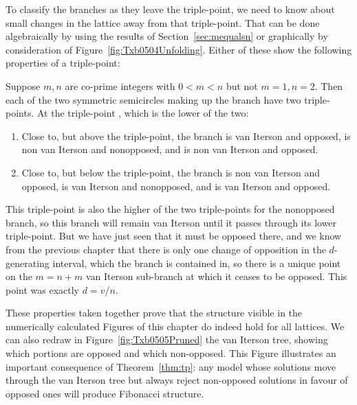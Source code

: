 %
%
To classify the branches as they leave the triple-point, we need to know about small changes in the lattice away from that triple-point. That can be done algebraically by using the results of Section~\ref{sec:mequalsn} or graphically by consideration of Figure~\ref{fig:Txb0504Unfolding}. Either of these show the following properties of a triple-point:
\begin{theorem}
	Suppose $m,n$ are co-prime integers with $0<m<n$ but not $m=1,n=2$. Then each of the two symmetric semicircles making up the branch  have two triple-points. At the triple-point , which is the lower of the two:
	\begin{enumerate}
		\item Close to, but above the triple-point, the branch   is van Iterson and opposed,  is non van Iterson  and nonopposed, and  is non van Iterson and opposed. 
		\item Close to, but below the triple-point, the branch  is non van Iterson and opposed,  is van Iterson and nonopposed, and  is van Iterson and opposed.
	\end{enumerate}
	\label{thm:tp}
\end{theorem}
This triple-point is also the higher of the two triple-points for the nonopposed branch, so this branch will remain van Iterson until it passes through its lower triple-point. But we have just seen that it must be opposed there, 
and we know from the previous chapter that there is only one change of opposition in the $d$-generating interval, which the branch is contained in, so there is a unique point on the $m=n+m$ van Iterson sub-branch at which it ceases to be opposed. This point was exactly $d=v/n$. 

These properties taken together prove that the structure visible in the numerically calculated Figures of this chapter do indeed hold for all lattices. We can also redraw in Figure~\ref{fig:Txb0505Pruned} the van Iterson tree, showing which portions are opposed and which non-opposed. This Figure illustrates an important consequence of Theorem~\ref{thm:tp}: any model whose solutions move through the van Iterson tree but always reject non-opposed solutions in favour of opposed ones will produce Fibonacci structure. 


